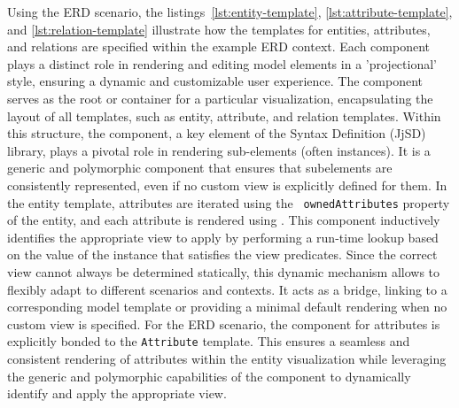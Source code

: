 Using the ERD scenario, the listings~\ref{lst:entity-template}, \ref{lst:attribute-template}, and \ref{lst:relation-template} illustrate how the templates for entities, attributes, and relations are specified within the example ERD context. Each component plays a distinct role in rendering and editing model elements in a 'projectional' style, ensuring a dynamic and customizable user experience.
%
The component  serves as the root or container for a particular visualization, encapsulating the layout of all templates, such as entity, attribute, and relation templates. Within this structure, the \code{} component, a key element of the \jjodel{} Syntax Definition (JjSD) library, plays a pivotal role in rendering sub-elements (often instances). It is a generic and polymorphic component that ensures that subelements are consistently represented, even if no custom view is explicitly defined for them.
%
In the entity template, attributes are iterated using the \texttt{ ownedAttributes} property of the entity, and each attribute is rendered using \code{}. This component inductively identifies the appropriate view to apply by performing a run-time lookup based on the value of the instance that satisfies the view predicates. Since the correct view cannot always be determined statically, this dynamic mechanism allows \code{} to flexibly adapt to different scenarios and contexts. It acts as a bridge, linking to a corresponding model template or providing a minimal default rendering when no custom view is specified.
%
For the ERD scenario, the \code{} component for attributes is explicitly bonded to the \texttt{Attribute} template. This ensures a seamless and consistent rendering of attributes within the entity visualization while leveraging the generic and polymorphic capabilities of the component to dynamically identify and apply the appropriate view.


